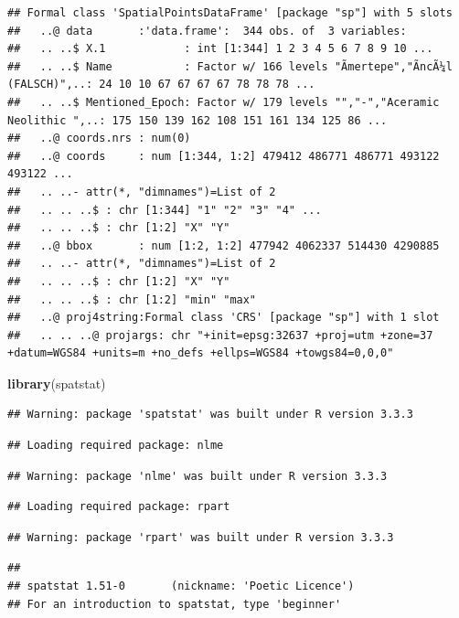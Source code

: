 \documentclass[]{article}
\newenvironment{Shaded}{\begin{snugshade}}{\end{snugshade}}
\newcommand{\KeywordTok}[1]{\textcolor[rgb]{0.13,0.29,0.53}{\textbf{{#1}}}}
\newcommand{\NormalTok}[1]{{#1}}
\begin{document}
\begin{verbatim}
## Formal class 'SpatialPointsDataFrame' [package "sp"] with 5 slots
##   ..@ data       :'data.frame':  344 obs. of  3 variables:
##   .. ..$ X.1            : int [1:344] 1 2 3 4 5 6 7 8 9 10 ...
##   .. ..$ Name           : Factor w/ 166 levels "Ãmertepe","ÃncÃ¼l (FALSCH)",..: 24 10 10 67 67 67 67 78 78 78 ...
##   .. ..$ Mentioned_Epoch: Factor w/ 179 levels "","-","Aceramic Neolithic ",..: 175 150 139 162 108 151 161 134 125 86 ...
##   ..@ coords.nrs : num(0) 
##   ..@ coords     : num [1:344, 1:2] 479412 486771 486771 493122 493122 ...
##   .. ..- attr(*, "dimnames")=List of 2
##   .. .. ..$ : chr [1:344] "1" "2" "3" "4" ...
##   .. .. ..$ : chr [1:2] "X" "Y"
##   ..@ bbox       : num [1:2, 1:2] 477942 4062337 514430 4290885
##   .. ..- attr(*, "dimnames")=List of 2
##   .. .. ..$ : chr [1:2] "X" "Y"
##   .. .. ..$ : chr [1:2] "min" "max"
##   ..@ proj4string:Formal class 'CRS' [package "sp"] with 1 slot
##   .. .. ..@ projargs: chr "+init=epsg:32637 +proj=utm +zone=37 +datum=WGS84 +units=m +no_defs +ellps=WGS84 +towgs84=0,0,0"
\end{verbatim}

\begin{Shaded}
\begin{Highlighting}[]
\KeywordTok{library}\NormalTok{(spatstat)}
\end{Highlighting}
\end{Shaded}

\begin{verbatim}
## Warning: package 'spatstat' was built under R version 3.3.3
\end{verbatim}

\begin{verbatim}
## Loading required package: nlme
\end{verbatim}

\begin{verbatim}
## Warning: package 'nlme' was built under R version 3.3.3
\end{verbatim}

\begin{verbatim}
## Loading required package: rpart
\end{verbatim}

\begin{verbatim}
## Warning: package 'rpart' was built under R version 3.3.3
\end{verbatim}

\begin{verbatim}
## 
## spatstat 1.51-0       (nickname: 'Poetic Licence') 
## For an introduction to spatstat, type 'beginner'
\end{verbatim}
\end{document}

